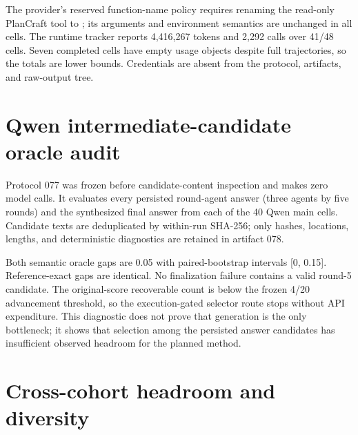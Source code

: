 The provider's reserved function-name policy requires renaming the read-only PlanCraft \texttt{} tool to \texttt{}; its arguments and environment semantics are unchanged in all cells. The runtime tracker reports 4,416,267 tokens and 2,292 calls over 41/48 cells. Seven completed cells have empty usage objects despite full trajectories, so the totals are lower bounds. Credentials are absent from the protocol, artifacts, and raw-output tree.

\section{Qwen intermediate-candidate oracle audit}

Protocol 077 was frozen before candidate-content inspection and makes zero model calls. It evaluates every persisted round-agent answer (three agents by five rounds) and the synthesized final answer from each of the 40 Qwen main cells. Candidate texts are deduplicated by within-run SHA-256; only hashes, locations, lengths, and deterministic diagnostics are retained in artifact 078.

\begin{center}
\end{center}

Both semantic oracle gaps are 0.05 with paired-bootstrap intervals [0, 0.15]. Reference-exact gaps are identical. No finalization failure contains a valid round-5 candidate. The original-score recoverable count is below the frozen 4/20 advancement threshold, so the execution-gated selector route stops without API expenditure. This diagnostic does not prove that generation is the only bottleneck; it shows that selection among the persisted answer candidates has insufficient observed headroom for the planned method.

\section{Cross-cohort headroom and diversity}
\label{app:headroom}

